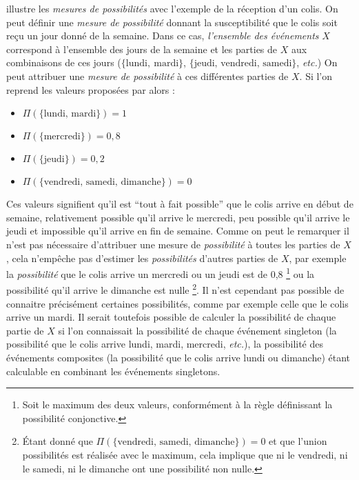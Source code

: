 \textcite{Bouchon-Meunier1995} illustre les \emph{mesures de
  possibilités} avec l'exemple de la réception d'un colis. On peut
définir une \emph{mesure de possibilité} donnant la susceptibilité que
le colis soit reçu un jour donné de la semaine. Dans ce cas,
\emph{l'ensemble des événements} \(X\) correspond à l'ensemble des
jours de la semaine et les parties de \(X\) aux combinaisons de ces
jours (\eg \(\{\text{lundi},\ \text{mardi}\}\),
\(\{\text{jeudi, vendredi, samedi}\}\), \emph{etc.})  On peut
attribuer une \emph{mesure de possibilité} à ces différentes parties
de \(X\). Si l'on reprend les valeurs proposées par
\textcite{Bouchon-Meunier1995} alors :
% 
\begin{itemize}
\item \(\Pi(\{\text{lundi, mardi}\})=1\)
\item \(\Pi(\{\text{mercredi}\})=0,8\)
\item \(\Pi(\{\text{jeudi}\})=0,2\)
\item \(\Pi(\{\text{vendredi, samedi, dimanche}\})=0\)
\end{itemize}
%
Ces valeurs signifient qu'il est \enquote{tout à fait possible} que le
colis arrive en début de semaine, relativement possible qu'il arrive
le mercredi, peu possible qu'il arrive le jeudi et impossible qu'il
arrive en fin de semaine. Comme on peut le remarquer il n'est pas
nécessaire d'attribuer une mesure de \emph{possibilité} à toutes les
parties de \(X\), cela n'empêche pas d'estimer les \emph{possibilités}
d'autres parties de \(X\), par exemple la \emph{possibilité} que le
colis arrive un mercredi ou un jeudi est de 0,8 \footnote{Soit le
  maximum des deux valeurs, conformément à la règle définissant la
  possibilité conjonctive.} ou la possibilité qu'il arrive le dimanche
est nulle \footnote{Étant donné que
  \(\Pi(\{\text{vendredi, samedi, dimanche}\})=0\) et que l'union
  possibilités est réalisée avec le maximum, cela implique que ni le
  vendredi, ni le samedi, ni le dimanche ont une possibilité non
  nulle.}. Il n'est cependant pas possible de connaitre précisément
certaines possibilités, comme par exemple celle que le colis arrive un
mardi. Il serait toutefois possible de calculer la possibilité de
chaque partie de \(X\) si l'on connaissait la possibilité de chaque
événement singleton (\ie la possibilité que le colis arrive lundi,
mardi, mercredi, \emph{etc.}), la possibilité des événements
composites (\eg la possibilité que le colis arrive lundi ou dimanche)
étant calculable en combinant les événements singletons.

